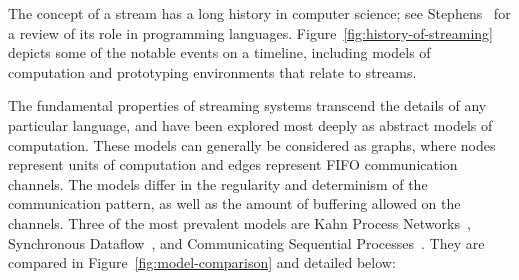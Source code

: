 The concept of a stream has a long history in computer science; see
Stephens~\cite{stephens_survey_1997} for a review of its role in
programming languages.  Figure~\ref{fig:history-of-streaming} depicts
some of the notable events on a timeline, including models of
computation and prototyping environments that relate to streams.

The fundamental properties of streaming systems transcend the details
of any particular language, and have been explored most deeply as
abstract models of computation.  These models can generally be
considered as graphs, where nodes represent units of computation and
edges represent FIFO communication channels.  The models differ in the
regularity and determinism of the communication pattern, as well as
the amount of buffering allowed on the channels.  Three of the most
prevalent models are Kahn Process Networks~\cite{kahn_semantics_1974},
Synchronous Dataflow~\cite{lee_static_1987}, and Communicating
Sequential Processes~\cite{hoare_communicating_1978}.  They are
compared in Figure~\ref{fig:model-comparison} and detailed below:


